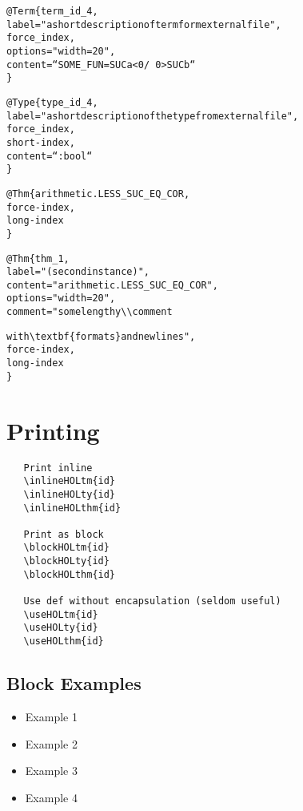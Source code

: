 \documentclass{article}
\begin{document}
\begin{alltt}
@Term\{term_id_4,
   label = "a short description of term form external file",
   force_index,
   options = "width=20",
   content = ``SOME_FUN = SUC a < 0 /\ 0 > SUC b``
\}

@Type\{type_id_4,
   label = "a short description of the type from external file",
   force_index,
   short-index,
   content = ``:bool``
\}

@Thm\{arithmetic.LESS_SUC_EQ_COR,
   force-index,
   long-index
\}

@Thm\{thm_1,
   label = "(second instance)",
   content = "arithmetic.LESS_SUC_EQ_COR",
   options = "width=20",
   comment = "some lengthy\verb-\\-comment

              with \verb-\-textbf\{formats\} and newlines",
   force-index,
   long-index
\}
\end{alltt}






\section{Printing}

\begin{verbatim}
   Print inline
   \inlineHOLtm{id}
   \inlineHOLty{id}
   \inlineHOLthm{id}

   Print as block
   \blockHOLtm{id}
   \blockHOLty{id}
   \blockHOLthm{id}

   Use def without encapsulation (seldom useful)
   \useHOLtm{id}
   \useHOLty{id}
   \useHOLthm{id}
\end{verbatim}

\subsection{Block Examples}
\begin{itemize}
\item Example 1 
\item Example 2 
\item Example 3 
\item Example 4 
\end{itemize}
\end{document}

